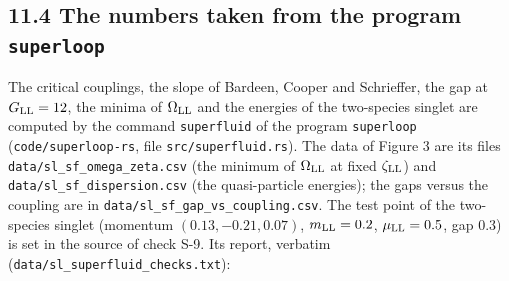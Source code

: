 \documentclass[
  10pt,
]{article}
\begin{document}
\hypertarget{the-numbers-taken-from-the-program-superloop}{%
\subsection{\texorpdfstring{11.4 The numbers taken from the program
\texttt{superloop}}{11.4 The numbers taken from the program superloop}}\label{the-numbers-taken-from-the-program-superloop}}

The critical couplings, the slope of Bardeen, Cooper and Schrieffer, the
gap at \(G_{\rm LL}=12\), the minima of \(\Omega_{\rm LL}\) and the
energies of the two-species singlet are computed by the command
\texttt{superfluid} of the program \texttt{superloop}
(\texttt{code/superloop-rs}, file \texttt{src/superfluid.rs}). The data
of Figure 3 are its files \texttt{data/sl\_sf\_omega\_zeta.csv} (the
minimum of \(\Omega_{\rm LL}\) at fixed \(\zeta_{\rm LL}\)) and
\texttt{data/sl\_sf\_dispersion.csv} (the quasi-particle energies); the
gaps versus the coupling are in
\texttt{data/sl\_sf\_gap\_vs\_coupling.csv}. The test point of the
two-species singlet (momentum \((0.13,-0.21,0.07)\), \(m_{\rm LL}=0.2\),
\(\mu_{\rm LL}=0.5\), gap 0.3) is set in the source of check S-9. Its
report, verbatim (\texttt{data/sl\_superfluid\_checks.txt}):
\end{document}
